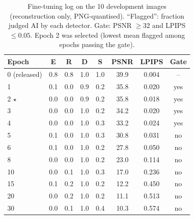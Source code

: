 \begin{table}[!t]
\caption{Fine-tuning log on the 10 development images (reconstruction only, PNG-quantised). ``Flagged'': fraction judged AI by each detector. Gate: PSNR $\geq 32$ and LPIPS $\leq 0.05$. Epoch 2 was selected (lowest mean flagged among epochs passing the gate).}
\label{tab:ft_log}
\centering\footnotesize
\begin{tabular}{l cccc cc c}
\toprule
Epoch & E & R & D & S & PSNR & LPIPS & Gate \\
\midrule
0 (released) & 0.8 & 0.8 & 1.0 & 1.0 & 39.9 & 0.004 & -- \\
1 & 0.1 & 0.0 & 0.9 & 0.2 & 35.8 & 0.020 & yes \\
2 $\star$ & 0.0 & 0.0 & 0.9 & 0.2 & 35.8 & 0.018 & yes \\
3 & 0.0 & 0.0 & 1.0 & 0.2 & 34.2 & 0.020 & yes \\
4 & 0.0 & 0.0 & 1.0 & 0.3 & 33.2 & 0.024 & yes \\
5 & 0.1 & 0.0 & 1.0 & 0.3 & 30.8 & 0.031 & no \\
6 & 0.1 & 0.0 & 1.0 & 0.2 & 27.8 & 0.050 & no \\
8 & 0.0 & 0.0 & 1.0 & 0.2 & 23.0 & 0.114 & no \\
10 & 0.0 & 0.1 & 1.0 & 0.3 & 17.0 & 0.236 & no \\
15 & 0.1 & 0.2 & 1.0 & 0.2 & 12.2 & 0.450 & no \\
20 & 0.0 & 0.2 & 1.0 & 0.2 & 11.1 & 0.513 & no \\
30 & 0.0 & 0.1 & 1.0 & 0.4 & 10.3 & 0.574 & no \\
\bottomrule
\end{tabular}
\end{table}


